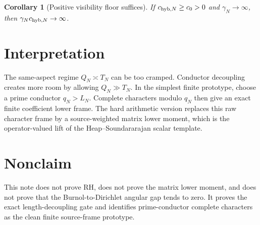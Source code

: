 \documentclass[11pt]{article}
\newtheorem{corollary}{Corollary}
\begin{document}
\begin{corollary}[Positive visibility floor suffices]
If $c_{{\rm hyb},N}\ge c_0>0$ and $\gamma_N\to\infty$, then $\gamma_Nc_{{\rm hyb},N}\to\infty$.
\end{corollary}

\section{Interpretation}
The same-aspect regime $Q_N\asymp T_N$ can be too cramped. Conductor decoupling creates more room by allowing $Q_N\gg T_N$. In the simplest finite prototype, choose a prime conductor $q_N>L_N$. Complete characters modulo $q_N$ then give an exact finite coefficient lower frame. The hard arithmetic version replaces this raw character frame by a source-weighted matrix lower moment, which is the operator-valued lift of the Heap--Soundararajan scalar template.

\section{Nonclaim}
This note does not prove RH, does not prove the matrix lower moment, and does not prove that the Burnol-to-Dirichlet angular gap tends to zero. It proves the exact length-decoupling gate and identifies prime-conductor complete characters as the clean finite source-frame prototype.
\end{document}
